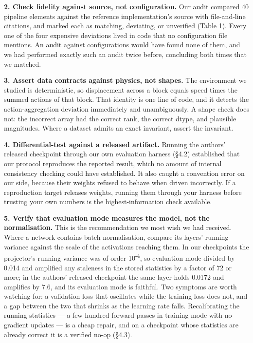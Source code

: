 \documentclass[10pt]{article}
\newcounter{none}
\begin{document}
\textbf{2. Check fidelity against source, not configuration.} Our audit compared 40 pipeline elements against the reference implementation's source with
file-and-line citations, and marked each as matching, deviating, or unverified
(Table 1). Every one of the four expensive deviations lived in code
that no configuration file mentions. An audit against configurations would have
found none of them, and we had performed exactly such an audit twice before,
concluding both times that we matched.

\textbf{3. Assert data contracts against physics, not shapes.} The environment we
studied is deterministic, so displacement across a block equals speed times the
summed actions of that block. That identity is one line of code, and it
detects the action-aggregation deviation immediately and unambiguously. A
shape check does not: the incorrect array had the correct rank, the correct
dtype, and plausible magnitudes. Where a dataset admits an exact invariant,
assert the invariant.

\textbf{4. Differential-test against a released artifact.} Running the authors'
released checkpoint through our own evaluation harness (\S{}4.2) established that
our protocol reproduces the reported result, which no amount of internal
consistency checking could have established. It also caught a convention error
on our side, because their weights refused to behave when driven incorrectly. If
a reproduction target releases weights, running them through your harness before
trusting your own numbers is the highest-information check available.

\textbf{5. Verify that evaluation mode measures the model, not the normalisation.}
This is the recommendation we most wish we had received. Where a network
contains batch normalisation, compare its layers' running variance against the
scale of the activations reaching them. In our checkpoints the projector's
running variance was of order 10\textsuperscript{-4}, so evaluation mode divided by 0.014 and
amplified any staleness in the stored statistics by a factor of 72 or more; in
the authors' released checkpoint the same layer holds 0.0172 and amplifies by
7.6, and its evaluation mode is faithful. Two symptoms are worth watching for:
a validation loss that oscillates while the training loss does not, and a gap
between the two that shrinks as the learning rate falls. Recalibrating the
running statistics --- a few hundred forward passes in training mode with no
gradient updates --- is a cheap repair, and on a checkpoint whose statistics are
already correct it is a verified no-op (\S{}4.3).
\end{document}
